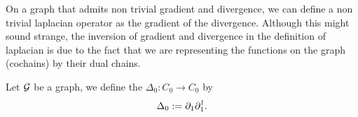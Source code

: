 \documentclass[../2.tex]{subfiles}
\begin{document}


    On a graph that admits non trivial gradient and divergence, we can define a non trivial laplacian operator as the gradient of the divergence.
    Although this might sound strange, the inversion of gradient and divergence in the definition of laplacian is due to the fact that we are representing
    the functions on the graph (cochains) by their dual chains.

    \begin{defn}
        Let $\mathcal{G}$ be a graph, we define the  $\Delta_0 : C_0 \to C_0$ by 
        \[ \Delta_0 := \partial_1 \partial^\dagger_1.\]
    \end{defn}
\end{document}
